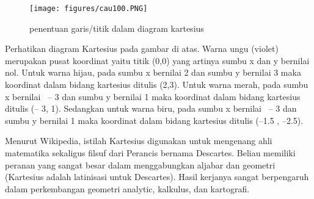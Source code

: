 \begin{figure}[ht]
	\centerline{\texttt{[image: figures/cau100.PNG]}}
	\caption{penentuan garis/titik dalam diagram kartesius}
	\label{cau100}
	\end{figure}

Perhatikan diagram Kartesius pada gambar di atas. Warna ungu (violet) merupakan pusat koordinat yaitu titik (0,0) yang artinya sumbu x dan y bernilai nol. Untuk warna hijau, pada sumbu x bernilai 2 dan sumbu y bernilai 3 maka koordinat dalam bidang kartesius ditulis (2,3). Untuk warna merah, pada sumbu x bernilai  – 3 dan sumbu y bernilai 1 maka koordinat dalam bidang kartesius ditulis (– 3, 1). Sedangkan untuk warna biru, pada sumbu x bernilai  – 3 dan sumbu y bernilai 1 maka koordinat dalam bidang kartesius ditulis (–1.5 , –2.5).

Menurut Wikipedia, istilah Kartesius digunakan untuk mengenang ahli matematika sekaligus filsuf dari Perancis bernama Descartes. Beliau memiliki peranan yang sangat besar dalam menggabungkan aljabar dan geometri (Kartesius adalah latinisasi untuk Descartes). Hasil kerjanya sangat berpengaruh dalam perkembangan geometri analytic, kalkulus, dan kartografi.


